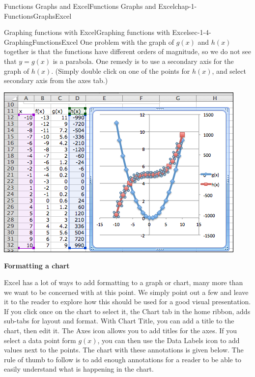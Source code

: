 \documentclass[oneside,10pt,]{book}
\newcommand{\terminology}[1]{\textbf{#1}}
\numberwithin{equation}{section}
\begin{document}
\begin{chapterptx}{Functions Graphs and Excel}{}{Functions Graphs and Excel}{}{}{chap-1-FunctionsGraphsExcel}
\begin{sectionptx}{Graphing functions with Excel}{}{Graphing functions with Excel}{}{}{sec-1-4-GraphingFunctionsExcel}
One problem with the graph of \(g(x)\) and \(h(x)\) together is that the functions have different orders of magnitude, so we do not see that \(y = g(x)\) is a parabola.  One remedy is to use a secondary axis for the graph of \(h(x)\).  (Simply double click on one of the points for \(h(x)\), and select secondary axis from the axes tab.)%
\begin{sidebyside}{1}{0.1}{0.1}{0}%
\begin{sbspanel}{0.8}%
\includegraphics[width=1\linewidth]{images/sec1-4-12.png}
\end{sbspanel}%
\end{sidebyside}%
\par
\hypertarget{p-335}{}%
\terminology{Formatting a chart}%
\par
\hypertarget{p-336}{}%
Excel has a lot of ways to add formatting to a graph or chart, many more than we want to be concerned with at this point.  We simply point out a few and leave it to the reader to explore how this should be used for a good visual presentation.  If you click once on the chart to select it, the Chart tab in the home ribbon, adds sub-tabs for layout and format.  With Chart Title, you can add a title to the chart, then edit it.  The Axes icon allows you to add titles for the axes.  If you select a data point form \(g(x)\), you can then use the Data Labels icon to add values next to the points.  The chart with these annotations is given below.  The rule of thumb to follow is to add enough annotations for a reader to be able to easily understand what is happening in the chart.%
\begin{sidebyside}{1}{0.1}{0.1}{0}%
\begin{sbspanel}{0.8}%

\end{sbspanel}
\end{sidebyside}
\end{sectionptx}
\end{chapterptx}
\end{document}
